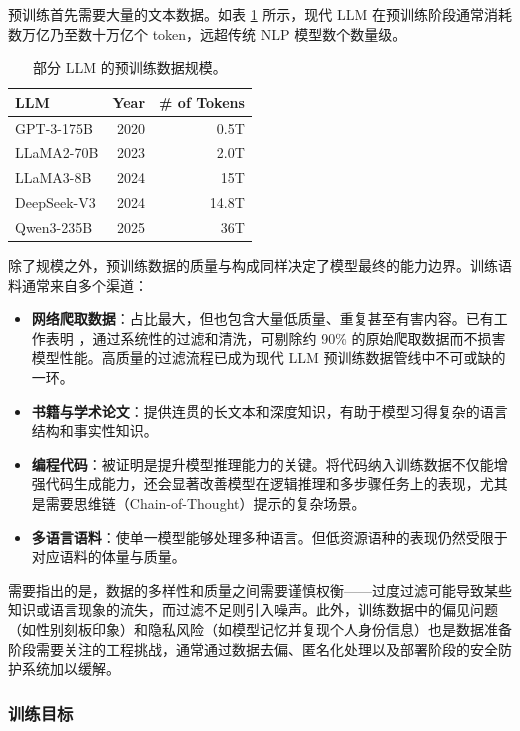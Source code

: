 预训练首先需要大量的文本数据。如表 \ref{tab:training-data-size-llm} 所示，现代 LLM 在预训练阶段通常消耗数万亿乃至数十万亿个 token，远超传统 NLP 模型数个数量级。

\begin{table}[t]
\centering
\begingroup
\renewcommand{\arraystretch}{1.2}
\begin{tabular}{l | r | r}
LLM & Year & \# of Tokens \\ \hline
GPT-3-175B \cite{brown-etal:2020language} & 2020 & 0.5T \\
LLaMA2-70B \cite{touvron-etal:2023llama} & 2023 & 2.0T \\
LLaMA3-8B \cite{dubey2024llama} & 2024 & 15T \\
DeepSeek-V3 \cite{liu2024deepseek} & 2024 & 14.8T \\
Qwen3-235B \cite{yang2025qwen3} & 2025 & 36T
\end{tabular}
\endgroup
\caption{部分 LLM 的预训练数据规模。}
\label{tab:training-data-size-llm}
\end{table}

除了规模之外，预训练数据的质量与构成同样决定了模型最终的能力边界。训练语料通常来自多个渠道：

\begin{itemize}
  \item \textbf{网络爬取数据}：占比最大，但也包含大量低质量、重复甚至有害内容。已有工作表明 \cite{penedo-etal:2023refinedweb}，通过系统性的过滤和清洗，可剔除约 90\% 的原始爬取数据而不损害模型性能。高质量的过滤流程已成为现代 LLM 预训练数据管线中不可或缺的一环。
  \item \textbf{书籍与学术论文}：提供连贯的长文本和深度知识，有助于模型习得复杂的语言结构和事实性知识。
  \item \textbf{编程代码}：被证明是提升模型推理能力的关键。将代码纳入训练数据不仅能增强代码生成能力，还会显著改善模型在逻辑推理和多步骤任务上的表现，尤其是需要思维链（Chain-of-Thought）提示的复杂场景。
  \item \textbf{多语言语料}：使单一模型能够处理多种语言。但低资源语种的表现仍然受限于对应语料的体量与质量。
\end{itemize}

需要指出的是，数据的多样性和质量之间需要谨慎权衡——过度过滤可能导致某些知识或语言现象的流失，而过滤不足则引入噪声。此外，训练数据中的偏见问题（如性别刻板印象）和隐私风险（如模型记忆并复现个人身份信息）也是数据准备阶段需要关注的工程挑战，通常通过数据去偏、匿名化处理以及部署阶段的安全防护系统加以缓解。

\subsubsection{训练目标}

